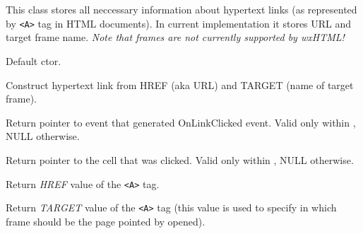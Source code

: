 \section{}\label{wxhtmllinkinfo}

This class stores all neccessary information about hypertext
links (as represented by {\tt <A>} tag in HTML documents). In 
current implementation it stores URL and target frame name.
{\it Note that frames are not currently supported by wxHTML!}




\label{wxhtmllinkinfowxhtmllinkinfo}


Default ctor.


Construct hypertext link from HREF (aka URL) and TARGET (name of target
frame).

\label{wxhtmllinkinfogetevent}


Return pointer to event that generated OnLinkClicked event. Valid
only within ,
NULL otherwise.

\label{wxhtmllinkinfogethtmlcell}


Return pointer to the cell that was clicked. Valid
only within ,
NULL otherwise.


\label{wxhtmllinkinfogethref}


Return {\it HREF} value of the {\tt <A>} tag.

\label{wxhtmllinkinfogettarget}


Return {\it TARGET} value of the {\tt <A>} tag (this value
is used to specify in which frame should be the page pointed
by  opened).

